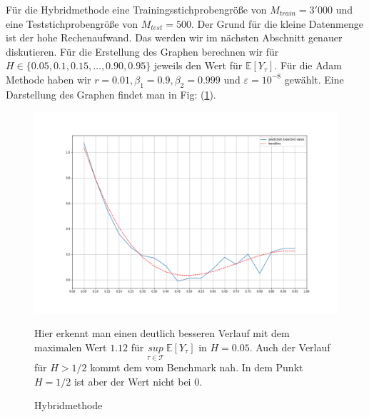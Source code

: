 \documentclass[12pt,titlepage,headsepline]{article}
\begin{document}
        \hfill\break
        Für die Hybridmethode eine Trainingsstichprobengröße von $M_{train}=3'000$ und eine Teststichprobengröße von $M_{test}=500$. Der Grund für die kleine Datenmenge ist der hohe Rechenaufwand. Das werden wir im nächsten Abschnitt genauer diskutieren. Für die Erstellung des Graphen berechnen wir für $H \in \{0.05,0.1,0.15,\ldots,0.90,0.95\}$ jeweils den Wert für $\mathbb{E}[Y_{\tau}]$. Für die Adam Methode haben wir $r = 0.01, \beta_1 = 0.9, \beta_2 = 0.999$ und $\varepsilon = 10^{-8}$ gewählt. Eine Darstellung des Graphen findet man in Fig: (\ref{hybrid_method}).
        \begin{figure}[H]\label{hybrid_method}
          \caption[hybrid_method]{Hybridmethode}
          \includegraphics[width=\textwidth]{hybrid_methode.png}
          {\footnotesize
          Hier erkennt man einen deutlich besseren Verlauf mit dem maximalen Wert $1.12$ für $\underset{\tau \in \mathcal{T}}{sup} \ \mathbb{E}[Y_{\tau}]$ in $H=0.05$. Auch der Verlauf für $H>1/2$ kommt dem vom Benchmark nah. In dem Punkt $H=1/2$ ist aber der Wert nicht bei 0.
          \par}
        \end{figure}
        \newpage
\end{document}
